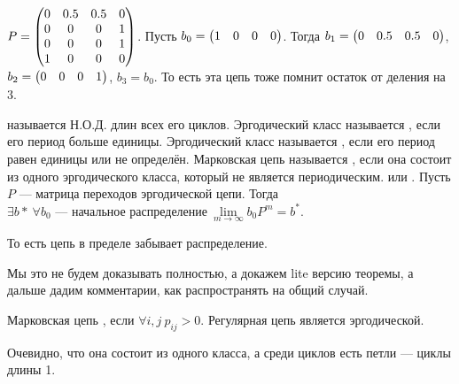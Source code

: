 \documentclass{article}
\begin{document}
\begin{itemize}
\begin{Example}
\begin{figure}[H]
            \end{figure}\noindent
            $P=\left(\begin{matrix}
                0 & 0.5 & 0.5 & 0\\
                0 & 0 & 0 & 1\\
                0 & 0 & 0 & 1\\
                1 & 0 & 0 & 0
            \end{matrix}\right)$. Пусть $b_0=\left(\begin{matrix}1 & 0 & 0 & 0\end{matrix}\right)$. Тогда $b_1=\left(\begin{matrix}0&0.5&0.5&0\end{matrix}\right)$, $b_2=\left(\begin{matrix}0&0&0&1\end{matrix}\right)$, $b_3=b_0$. То есть эта цепь тоже помнит остаток от деления на 3.
        \end{Example}
        \dfn {} называется Н.О.Д. длин всех его циклов.
        \dfn Эргодический класс называется , если его период больше единицы.
        \dfn Эргодический класс называется , если его период равен единицы или не определён.
        \dfn Марковская цепь называется , если она состоит из одного эргодического класса, который не является периодическим.
        \thm {} или . Пусть $P$ --- матрица переходов эргодической цепи. Тогда $\exists b*~\forall b_0\text{ --- начальное распределение}~\lim\limits_{m\to\infty}b_0P^m=b^*$.
        \begin{Comment}
            То есть цепь в пределе забывает распределение.
        \end{Comment}
        \begin{Comment}
            Мы это не будем доказывать полностью, а докажем lite версию теоремы, а дальше дадим комментарии, как распространять на общий случай.
        \end{Comment}
        \dfn Марковская цепь , если $\forall i,j~p_{ij}>0$.
        \thm Регулярная цепь является эргодической.
        \begin{Proof}
            Очевидно, что она состоит из одного класса, а среди циклов есть петли --- циклы длины 1.
        \end{Proof}

\end{itemize}
\end{document}
